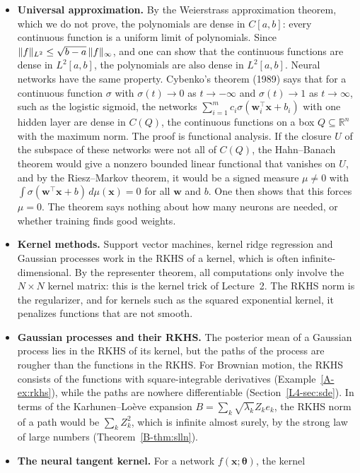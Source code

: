 \begin{itemize}
    \item \textbf{Universal approximation.} By the Weierstrass approximation theorem, which we do not prove, the polynomials are dense in $C[a, b]$: every continuous function is a uniform limit of polynomials. Since $\lVert f \rVert_{L^2} \leq \sqrt{b - a}\,\lVert f \rVert_\infty$, and one can show that the continuous functions are dense in $L^2[a, b]$, the polynomials are also dense in $L^2[a, b]$. Neural networks have the same property. Cybenko's theorem (1989) says that for a continuous function $\sigma$ with $\sigma(t) \to 0$ as $t \to -\infty$ and $\sigma(t) \to 1$ as $t \to \infty$, such as the logistic sigmoid, the networks $\sum_{i=1}^m c_i\sigma(\mathbf{w}_i^\top\mathbf{x} + b_i)$ with one hidden layer are dense in $C(Q)$, the continuous functions on a box $Q \subseteq \mathbb{R}^n$ with the maximum norm. The proof is functional analysis. If the closure $U$ of the subspace of these networks were not all of $C(Q)$, the Hahn--Banach theorem would give a nonzero bounded linear functional that vanishes on $U$, and by the Riesz--Markov theorem, it would be a signed measure $\mu \neq 0$ with $\int \sigma(\mathbf{w}^\top\mathbf{x} + b)\, d\mu(\mathbf{x}) = 0$ for all $\mathbf{w}$ and $b$. One then shows that this forces $\mu = 0$. The theorem says nothing about how many neurons are needed, or whether training finds good weights.
    \item \textbf{Kernel methods.} Support vector machines, kernel ridge regression and Gaussian processes work in the RKHS of a kernel, which is often infinite-dimensional. By the representer theorem, all computations only involve the $N \times N$ kernel matrix: this is the kernel trick of Lecture~2. The RKHS norm is the regularizer, and for kernels such as the squared exponential kernel, it penalizes functions that are not smooth.
    \item \textbf{Gaussian processes and their RKHS.} The posterior mean of a Gaussian process lies in the RKHS of its kernel, but the paths of the process are rougher than the functions in the RKHS. For Brownian motion, the RKHS consists of the functions with square-integrable derivatives (Example~\ref{A-ex:rkhs}), while the paths are nowhere differentiable (Section~\ref{L4-sec:sde}). In terms of the Karhunen--Lo\`eve expansion $B = \sum_k \sqrt{\lambda_k}Z_ke_k$, the RKHS norm of a path would be $\sum_k Z_k^2$, which is infinite almost surely, by the strong law of large numbers (Theorem~\ref{B-thm:slln}).
    \item \textbf{The neural tangent kernel.} For a network $f(\mathbf{x}; \boldsymbol{\theta})$, the kernel

\end{itemize}
